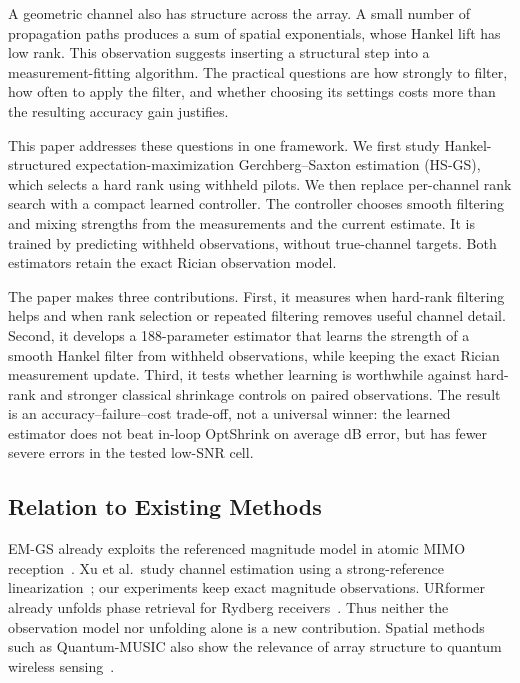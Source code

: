 \documentclass[10pt,journal,letterpaper]{IEEEtran}
\begin{document}
A geometric channel also has structure across the array. A small number of propagation paths produces a sum of spatial exponentials, whose Hankel lift has low rank. This observation suggests inserting a structural step into a measurement-fitting algorithm. The practical questions are how strongly to filter, how often to apply the filter, and whether choosing its settings costs more than the resulting accuracy gain justifies.

This paper addresses these questions in one framework. We first study Hankel-structured expectation-maximization Gerchberg--Saxton estimation (HS-GS), which selects a hard rank using withheld pilots. We then replace per-channel rank search with a compact learned controller. The controller chooses smooth filtering and mixing strengths from the measurements and the current estimate. It is trained by predicting withheld observations, without true-channel targets. Both estimators retain the exact Rician observation model.

The paper makes three contributions. First, it measures when hard-rank filtering helps and when rank selection or repeated filtering removes useful channel detail. Second, it develops a 188-parameter estimator that learns the strength of a smooth Hankel filter from withheld observations, while keeping the exact Rician measurement update. Third, it tests whether learning is worthwhile against hard-rank and stronger classical shrinkage controls on paired observations. The result is an accuracy--failure--cost trade-off, not a universal winner: the learned estimator does not beat in-loop OptShrink on average dB error, but has fewer severe errors in the tested low-SNR cell.

\subsection{Relation to Existing Methods}
EM-GS already exploits the referenced magnitude model in atomic MIMO reception~\cite{cui2025}. Xu et al.\ study channel estimation using a strong-reference linearization~\cite{xu2025}; our experiments keep exact magnitude observations. URformer already unfolds phase retrieval for Rydberg receivers~\cite{xiao2026}. Thus neither the observation model nor unfolding alone is a new contribution. Spatial methods such as Quantum-MUSIC also show the relevance of array structure to quantum wireless sensing~\cite{kim2025quantummusic}.
\end{document}
